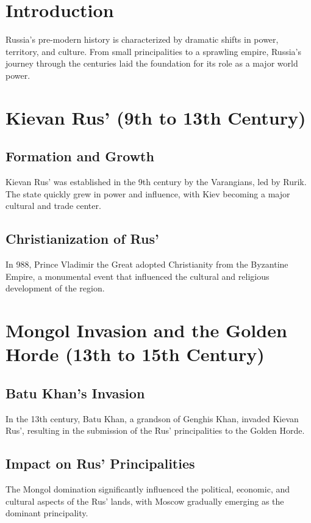 \documentclass[a4paper,12pt]{book}
\begin{document}
\section{Introduction}
\label{sec:introduction-pre-modern-russia}
Russia's pre-modern history is characterized by dramatic shifts in power, territory, and culture. From small principalities to a sprawling empire, Russia’s journey through the centuries laid the foundation for its role as a major world power.

\section{Kievan Rus’ (9th to 13th Century)}
\label{sec:kievan-rus}
\subsection{Formation and Growth}
Kievan Rus’ was established in the 9th century by the Varangians, led by Rurik. The state quickly grew in power and influence, with Kiev becoming a major cultural and trade center.

\subsection{Christianization of Rus’}
In 988, Prince Vladimir the Great adopted Christianity from the Byzantine Empire, a monumental event that influenced the cultural and religious development of the region.

\section{Mongol Invasion and the Golden Horde (13th to 15th Century)}
\label{sec:mongol-invasion}
\subsection{Batu Khan’s Invasion}
In the 13th century, Batu Khan, a grandson of Genghis Khan, invaded Kievan Rus’, resulting in the submission of the Rus’ principalities to the Golden Horde.

\subsection{Impact on Rus’ Principalities}
The Mongol domination significantly influenced the political, economic, and cultural aspects of the Rus’ lands, with Moscow gradually emerging as the dominant principality.
\end{document}
